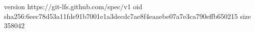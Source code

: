 version https://git-lfs.github.com/spec/v1
oid sha256:6eec78d53a11fde91b7001e1a3decdc7ae8f4eaaebe07a7e3ca790effb650215
size 358042
